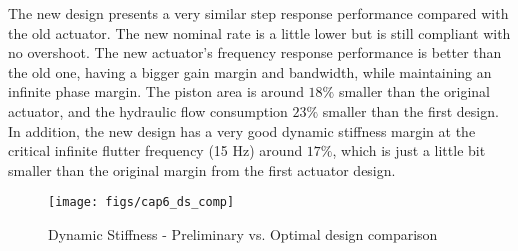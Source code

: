The new design presents a very similar step response performance compared with the old actuator. The new nominal rate is a little lower but is still compliant with no overshoot. The new actuator's frequency response performance is better than the old one, having a bigger gain margin and bandwidth, while maintaining an infinite phase margin. The piston area is around $18\%$ smaller than the original actuator, and the hydraulic flow consumption $23\%$ smaller than the first design. In addition, the new design has a very good dynamic stiffness margin at the critical infinite flutter frequency (15 Hz) around $17\%$, which is just a little bit smaller than the original margin from the first actuator design.

\begin{figure}[H]
\centering
\texttt{[image: figs/cap6\_ds\_comp]}
\caption{Dynamic Stiffness - Preliminary vs. Optimal design comparison}
\label{fig:ds_newdesign2}
\end{figure}